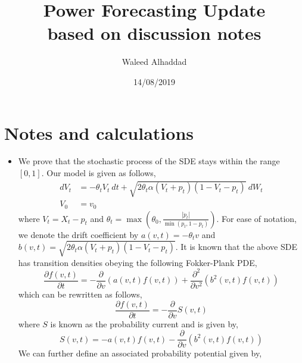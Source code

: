 \documentclass[a4paper, 12pt]{article}
\title{Power Forecasting Update \\ based on discussion notes}
\author{Waleed Alhaddad}
\date{14/08/2019}
\begin{document}
\maketitle



\section{Notes and calculations}
\begin{itemize}
\item We prove that the stochastic process of the SDE stays within the range $[0,1]$. Our model is given as follows,
\begin{equation}
\begin{split}
dV_t &=  - \theta_t V_t \  dt + \sqrt{2 \theta_t \alpha (V_t +p_t ) (1-V_t-p_t)} \  dW_t  \\ %
V_0 & = v_0
\end{split}\label{VtSDE}
\end{equation}
where $V_t = X_t - p_t$ and $\theta_t = \max \left( \theta_0 , \frac{|\dot{p}_t|}{\min \left( p_t, 1-p_t\right)} \right)$. For ease of notation, we denote the drift coefficient by $a(v,t) = -\theta_t v$  and $b(v,t)=\sqrt{2 \theta_t \alpha (V_t +p_t ) (1-V_t-p_t)} $. It is known that the above SDE has transition densities obeying the following Fokker-Plank PDE,
\begin{equation}
	\frac{\partial f(v, t)}{\partial t} = - \frac{\partial}{\partial v} \left( a(v,t) f(v,t) \right) + \frac{\partial^2}{\partial v^2} \left( b^2(v,t) f(v,t)\right)
\end{equation}
which can be rewritten as follows,
\begin{equation}
	\frac{\partial f(v, t)}{\partial t} =- \frac{\partial}{\partial v} S(v,t)
\end{equation}
where $S$ is known as the probability current and is given by,
\begin{equation}
	S(v,t) = - a(v,t) f(v,t) - \frac{\partial}{\partial v} \left( b^2(v,t) f(v,t) \right)
\end{equation}
We can further define an associated probability potential given by,

\end{itemize}
\end{document}
